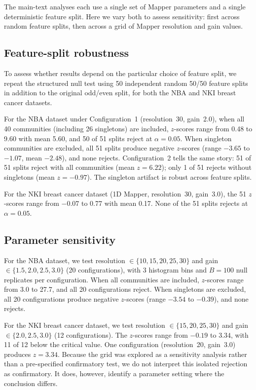 \documentclass[hidelinks]{siamart251216}
\begin{document}
The main-text analyses each use a single set of Mapper parameters and a
single deterministic feature split.  Here we vary both to assess
sensitivity: first across random feature splits, then across a grid of
Mapper resolution and gain values.

\subsection{Feature-split robustness}\label{sm:feature-splits}

To assess whether results depend on the particular choice of feature
split, we repeat the structured null test using 50 independent random
50/50 feature splits in addition to
the original odd/even split, for both the NBA and NKI breast cancer
datasets.

For the NBA dataset under Configuration~1 (resolution~30, gain~2.0),
when all 40 communities (including 26 singletons) are included,
$z$-scores range from 0.48 to 9.60 with mean 5.60, and 50 of 51 splits
reject at $\alpha = 0.05$.  When singleton communities are excluded, all
51 splits produce negative $z$-scores (range $-3.65$ to $-1.07$, mean
$-2.48$), and none rejects.  Configuration~2 tells the same story: 51 of
51 splits reject with all communities (mean $z = 6.22$); only 1 of 51
rejects without singletons (mean $z = -0.97$).  The singleton artifact
is robust across feature splits.

For the NKI breast cancer dataset (1D Mapper, resolution~30, gain~3.0),
the 51 $z$-scores range from $-0.07$ to 0.77 with mean 0.17.  None of
the 51 splits rejects at $\alpha = 0.05$.

\subsection{Parameter sensitivity}\label{sm:param-sensitivity}

For the NBA dataset, we test resolution $\in \{10, 15, 20, 25, 30\}$ and
gain $\in \{1.5, 2.0, 2.5, 3.0\}$ (20 configurations), with 3 histogram
bins and $B = 100$ null replicates per configuration.  When all
communities are included, $z$-scores range from 3.0 to 27.7, and all 20
configurations reject.  When singletons are excluded, all 20
configurations produce negative $z$-scores (range $-3.54$ to $-0.39$),
and none rejects.

For the NKI breast cancer dataset, we test resolution $\in \{15, 20, 25,
30\}$ and gain $\in \{2.0, 2.5, 3.0\}$ (12 configurations).  The
$z$-scores range from $-0.19$ to $3.34$, with 11 of 12 below the
critical value.  One configuration (resolution~20, gain~3.0) produces $z = 3.34$.
Because the grid was explored as a sensitivity analysis rather than a
pre-specified confirmatory test, we do not interpret this isolated
rejection as confirmatory.  It does, however, identify a parameter
setting where the conclusion differs.
\end{document}
